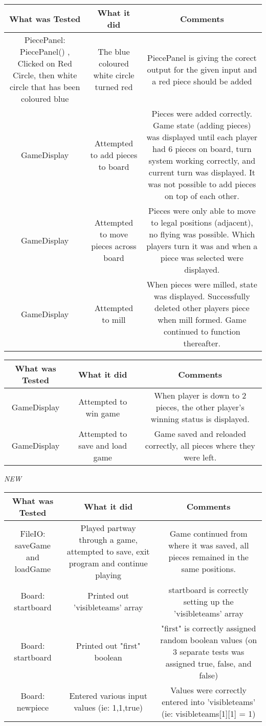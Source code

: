 \documentclass[12pt]{article}
\begin{document}
	\begin{tabularx}{\linewidth}{|C|C|C|}
		\hline
		What was Tested & What it did & Comments \\
		\hline 
		PiecePanel: PiecePanel()  , Clicked on Red Circle, then white circle that has been coloured blue & The blue coloured white circle turned red & PiecePanel is giving the corect output for the given input and a red piece should be added \\
		\hline
		GameDisplay & Attempted to add pieces to board & Pieces were added correctly. Game state (adding pieces) was displayed until each player had 6 pieces on board, turn system working correctly, and current turn was displayed. It was not possible to add pieces on top of each other. \\
		\hline
		GameDisplay & Attempted to move pieces across board & Pieces were only able to move to legal positions (adjacent), no flying was possible. Which players turn it was and when a piece was selected were displayed. \\
		\hline
		GameDisplay & Attempted to mill & When pieces were milled, state was displayed. Successfully deleted other players piece when mill formed. Game continued to function thereafter.\\ 
		\hline
		\end{tabularx}
		\newpage
		\begin{tabularx}{\linewidth}{|C|C|C|}
		\hline
		What was Tested & What it did & Comments \\
		\hline
		GameDisplay & Attempted to win game & When player is down to 2 pieces, the other player's winning status is displayed. \\
		\hline
		GameDisplay & Attempted to save and load game & Game saved and reloaded correctly, all pieces where they were left. \\  
		\hline
	\end{tabularx}
	\newpage
	\emph{NEW} \\
	\begin{tabularx}{\linewidth}{|C|C|C|}
		\hline 
		What was Tested & What it did & Comments \\
		\hline 
		        FileIO: saveGame and loadGame & Played partway through a game, attempted to save, exit program and continue playing & Game continued from where it was saved, all pieces remained in the same positions. \\
		        \hline 
		        Board: startboard & Printed out 'visibleteams' array & startboard is correctly setting up the 'visibleteams' array \\
		        \hline 
		        Board: startboard & Printed out "first" boolean & "first" is correctly assigned random boolean values (on 3 separate tests was assigned true, false, and false) \\
		        \hline 
		        Board: newpiece & Entered various input values (ie: 1,1,true) & Values were correctly entered into 'visibleteams' (ie: visibleteams[1][1] = 1) \\	        
		\hline
	\end{tabularx}	     
\end{document}
